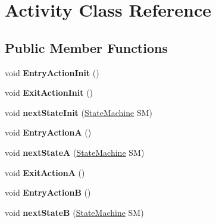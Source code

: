 \hypertarget{class_activity}{\section{Activity Class Reference}
\label{class_activity}
}
\subsection*{Public Member Functions}
\begin{DoxyCompactItemize}
\item 
\hypertarget{class_activity_a1ecc6ee41881e5ffa81356f086b6ccc4}{void {\bfseries Entry\-Action\-Init} ()}\label{class_activity_a1ecc6ee41881e5ffa81356f086b6ccc4}

\item 
\hypertarget{class_activity_aa61692846e34219d956f7d8e460682ac}{void {\bfseries Exit\-Action\-Init} ()}\label{class_activity_aa61692846e34219d956f7d8e460682ac}

\item 
\hypertarget{class_activity_a43f600dfb966a5aec048dbad2552064b}{void {\bfseries next\-State\-Init} (\hyperlink{class_state_machine}{State\-Machine} S\-M)}\label{class_activity_a43f600dfb966a5aec048dbad2552064b}

\item 
\hypertarget{class_activity_aa6746c91dc931e7df308171bb12db7cb}{void {\bfseries Entry\-Action\-A} ()}\label{class_activity_aa6746c91dc931e7df308171bb12db7cb}

\item 
\hypertarget{class_activity_a50975cab4cfcb2f1ab2cdc9795bddfa3}{void {\bfseries next\-State\-A} (\hyperlink{class_state_machine}{State\-Machine} S\-M)}\label{class_activity_a50975cab4cfcb2f1ab2cdc9795bddfa3}

\item 
\hypertarget{class_activity_a85bb3354e0c4ceab6e942f7ed1a6c581}{void {\bfseries Exit\-Action\-A} ()}\label{class_activity_a85bb3354e0c4ceab6e942f7ed1a6c581}

\item 
\hypertarget{class_activity_ace37aec6b652bcfb415dac80c59f06d6}{void {\bfseries Entry\-Action\-B} ()}\label{class_activity_ace37aec6b652bcfb415dac80c59f06d6}

\item 
\hypertarget{class_activity_a3adc646b4161d2e62aa386df5c630319}{void {\bfseries next\-State\-B} (\hyperlink{class_state_machine}{State\-Machine} S\-M)}\label{class_activity_a3adc646b4161d2e62aa386df5c630319}


\end{DoxyCompactItemize}

